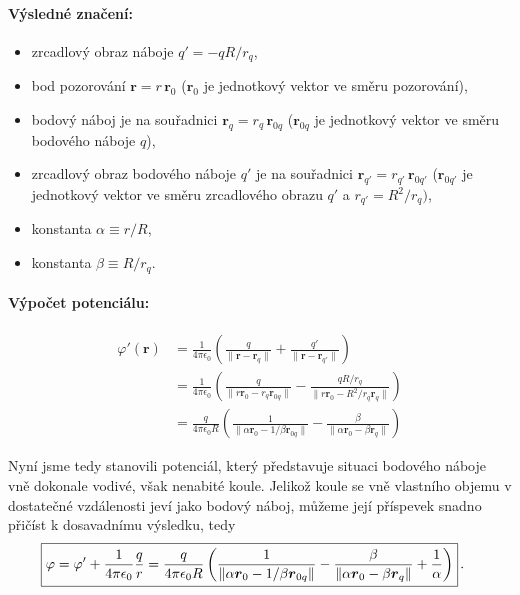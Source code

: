 \documentclass{article}
\def\({\left(}
\def\){\right)}
\def\endl{\\[3mm]}
\renewcommand{\vec}[1]{\boldsymbol{#1}}
\begin{document}
		\paragraph{Výsledné značení:}
			\begin{itemize}
				\item zrcadlový obraz náboje $q' = - q R/r_q$,
				\item bod pozorování $\vec r = r \, \vec r_0$ ($\vec r_0$ je jednotkový vektor ve směru pozorování),
				\item bodový náboj je na souřadnici $\vec r_q = r_q \, \vec r_{0q} $ ($\vec r_{0q}$ je jednotkový vektor ve směru bodového náboje $q$),
				\item zrcadlový obraz bodového náboje $q'$ je na souřadnici $\vec r_{q'} = r_{q'} \, \vec r_{0q'}$ ($\vec r_{0q'}$ je jednotkový vektor ve směru zrcadlového obrazu $q'$ a $r_{q'} = R^2/r_q)$,
				\item konstanta $\alpha \equiv r/R$,
				\item konstanta $\beta \equiv R/r_q$.
			\end{itemize}
		
		\paragraph{Výpočet potenciálu:}
			\begin{align*}
				\varphi'(\vec r)
				&= \frac{1}{4 \pi \epsilon_0} \( \frac{q}{ \|\vec r - \vec r_q \| } + \frac{q'}{ \| \vec r - \vec r_{q'} \| } \) \endl
				&= \frac{1}{4 \pi \epsilon_0} \( \frac{q}{ \| r \vec r_0 - r_q \vec r_{0q} \| } - \frac{qR/r_q}{ \| r \vec r_0 - R^2/r_q \vec r_q \| } \) \endl
				&= \frac{q}{4 \pi \epsilon_0 R} \( \frac{1}{ \| \alpha \vec r_0 - 1/\beta \vec r_{0q} \| } - \frac{\beta}{ \| \alpha \vec r_0 - \beta \vec r_q \| } \)
			\end{align*}
		
		Nyní jsme tedy stanovili potenciál, který představuje situaci bodového náboje vně dokonale vodivé, však nenabité koule. Jelikož koule se vně vlastního objemu v dostatečné vzdálenosti jeví jako bodový náboj, můžeme její příspevek snadno přičíst k dosavadnímu výsledku, tedy
		\begin{align*}
			\Aboxed{\varphi
			= \varphi' + \frac{1}{4 \pi \epsilon_0} \frac{q}{r}
			= \frac{q}{4 \pi \epsilon_0 R} \( \frac{1}{ \| \alpha \vec r_0 - 1/\beta \vec r_{0q} \| } - \frac{\beta}{ \| \alpha \vec r_0 - \beta \vec r_q \| } + \frac{1}{\alpha} \)} \, .
		\end{align*} \\
		
\end{document}
